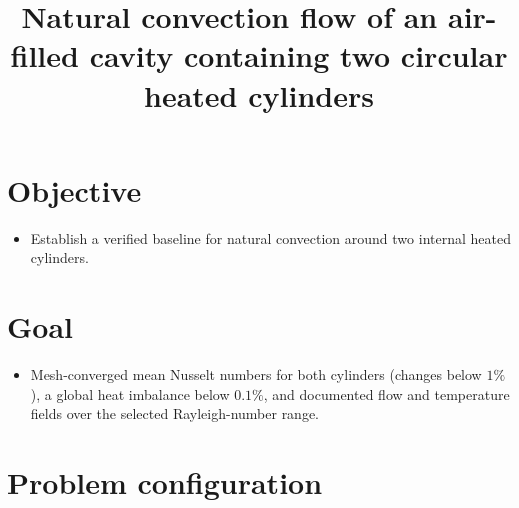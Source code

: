 \documentclass[preprint,3p,number]{elsarticle}
\begin{document}
\title{Natural convection flow of an air-filled cavity containing two circular heated cylinders}
\maketitle

\section{Objective}

\begin{itemize}
    \item Establish a verified baseline for natural convection around two
    internal heated cylinders.
\end{itemize}

\section{Goal}

\begin{itemize}
    \item Mesh-converged mean Nusselt numbers for both cylinders
    (changes below $1\%$), a global heat imbalance below $0.1\%$, and documented
    flow and temperature fields over the selected Rayleigh-number range.
\end{itemize}

\section{Problem configuration}
\end{document}
